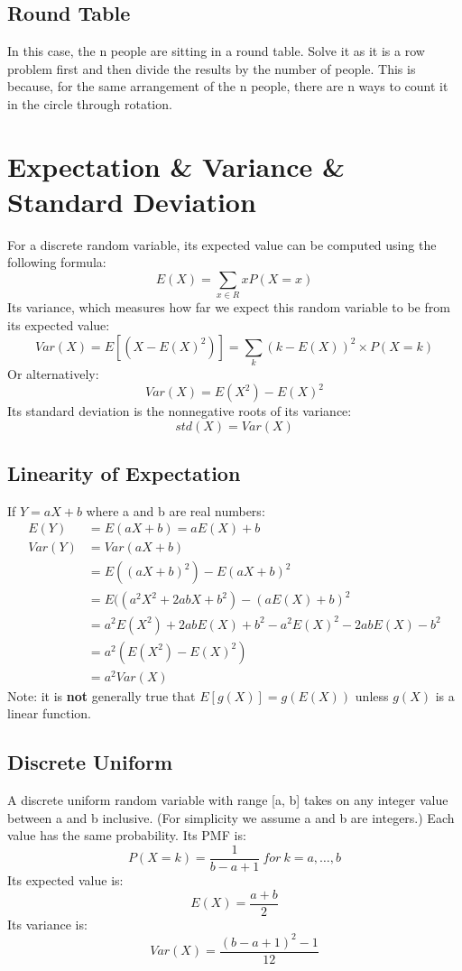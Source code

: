 \documentclass[11pt]{article}
\begin{document}
\subsection{Round Table}
In this case, the n people are sitting in a round table. Solve it as it is a row problem first and then divide the results by the number of people.
This is because, for the same arrangement of the n people, there are n ways to count it in the circle through rotation. 

\section{Expectation \& Variance \& Standard Deviation}
For a discrete random variable, its expected value can be computed using the following formula:
$$E(X) = \sum_{x \in R} xP(X=x)$$
Its variance, which measures how far we expect this random variable to be from its expected value:
$$Var(X) = E[(X - E(X)^2)] = \sum_{k} (k - E(X))^2 \times P(X=k)$$
Or alternatively:
$$Var(X) = E(X^2) - E(X)^2$$
Its standard deviation is the nonnegative roots of its variance:
$$std(X) = Var(X)$$

\subsection{Linearity of Expectation}
If $Y = aX+b$ where a and b are real numbers: 
\begin{align*}
  E(Y) &= E(aX + b) = aE(X) + b \\
  Var(Y) &= Var(aX + b) 
  \\ &= E((aX + b)^2) - E(aX + b)^2 
  \\ &= E((a^2X^2 + 2abX + b^2) - (aE(X) + b)^2 
  \\ &= a^2E(X^2) + 2abE(X) + b^2 - a^2E(X)^2 - 2abE(X) - b^2 
  \\ &= a^2 (E(X^2) - E(X)^2) 
  \\ &= a^2Var(X)
\end{align*}
Note: it is \textbf{not} generally true that $E[g(X)] = g(E(X))$ unless $g(X)$ is a linear function.

\subsection{Discrete Uniform}
A discrete uniform random variable with range [a, b] takes on any integer value between a and b inclusive. (For simplicity we assume a and b are integers.)
Each value has the same probability.
Its PMF is:
$$P(X = k) = \frac{1}{b - a + 1} \: for \: k = a, \ldots, b$$
Its expected value is:
$$E(X) = \frac{a+b}{2}$$
Its variance is:
$$Var(X) = \frac{(b-a+1)^2-1}{12}$$
\end{document}
